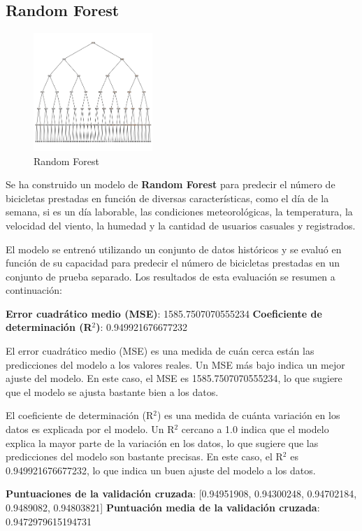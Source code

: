 \documentclass{wsdcr}
\begin{document}
\subsection{Random Forest}
\begin{figure}[h]
    \centering
    \includegraphics[width=0.4\textwidth]{charts/random_forest.png}
    \caption{Random Forest}
    \label{fig:randomforest}
\end{figure}
Se ha construido un modelo de \textbf{Random Forest} para predecir el número de bicicletas prestadas en función de diversas características, como el día de la semana, si es un día laborable, las condiciones meteorológicas, la temperatura, la velocidad del viento, la humedad y la cantidad de usuarios casuales y registrados.

El modelo se entrenó utilizando un conjunto de datos históricos y se evaluó en función de su capacidad para predecir el número de bicicletas prestadas en un conjunto de prueba separado. Los resultados de esta evaluación se resumen a continuación:

\textbf{Error cuadrático medio (MSE)}: 1585.7507070555234
\textbf{Coeficiente de determinación (R$^2$)}: 0.949921676677232

El error cuadrático medio (MSE) es una medida de cuán cerca están las predicciones del modelo a los valores reales. Un MSE más bajo indica un mejor ajuste del modelo. En este caso, el MSE es 1585.7507070555234, lo que sugiere que el modelo se ajusta bastante bien a los datos.

El coeficiente de determinación (R$^2$) es una medida de cuánta variación en los datos es explicada por el modelo. Un R$^2$ cercano a 1.0 indica que el modelo explica la mayor parte de la variación en los datos, lo que sugiere que las predicciones del modelo son bastante precisas. En este caso, el R$^2$ es 0.949921676677232, lo que indica un buen ajuste del modelo a los datos.

\textbf{Puntuaciones de la validación cruzada}: [0.94951908, 0.94300248, 0.94702184, 0.9489082, 0.94803821]
\textbf{Puntuación media de la validación cruzada}: 0.9472979615194731
\end{document}
